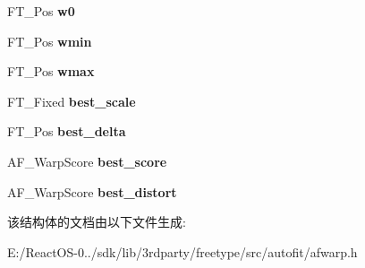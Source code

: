 \begin{DoxyCompactItemize}
F\+T\+\_\+\+Pos {\bfseries w0}
\item 
\mbox{\label{struct_a_f___warper_rec___a1a15dc2afdcfa705501098c171b25866}} 
F\+T\+\_\+\+Pos {\bfseries wmin}
\item 
\mbox{\label{struct_a_f___warper_rec___a1c9cf18c0275832edc88c0e4ede6bfe3}} 
F\+T\+\_\+\+Pos {\bfseries wmax}
\item 
\mbox{\label{struct_a_f___warper_rec___ae0a0caa7063809f2fea6fa3b8a59e183}} 
F\+T\+\_\+\+Fixed {\bfseries best\+\_\+scale}
\item 
\mbox{\label{struct_a_f___warper_rec___a6a76ab4d788fb42e02df6e1fb140aa03}} 
F\+T\+\_\+\+Pos {\bfseries best\+\_\+delta}
\item 
\mbox{\label{struct_a_f___warper_rec___a41352949e7c0eae7cb2fbbde4bfecad3}} 
A\+F\+\_\+\+Warp\+Score {\bfseries best\+\_\+score}
\item 
\mbox{\label{struct_a_f___warper_rec___ae072c9a54aa08d707a1dbd60b0e5eff8}} 
A\+F\+\_\+\+Warp\+Score {\bfseries best\+\_\+distort}
\end{DoxyCompactItemize}


该结构体的文档由以下文件生成\+:\begin{DoxyCompactItemize}
\item 
E\+:/\+React\+O\+S-\/0../sdk/lib/3rdparty/freetype/src/autofit/afwarp.\+h\end{DoxyCompactItemize}
